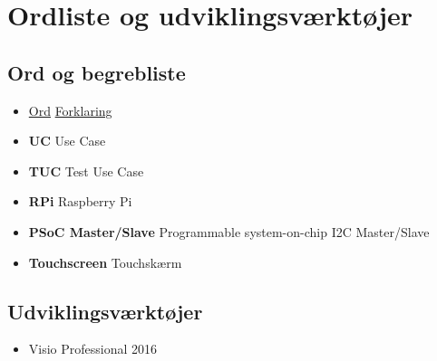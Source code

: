 \chapter{Ordliste og udviklingsværktøjer}
\section{Ord og begrebliste}

\begin{itemize}
    \item[\null] \underline{Ord} \tab \underline{Forklaring}
    \item \textbf{UC} \tab Use Case
    \item \textbf{TUC} \tab Test Use Case
    \item \textbf{RPi} \tab Raspberry Pi
    \item \textbf{PSoC Master/Slave} \tab Programmable system-on-chip I2C Master/Slave
    \item \textbf{Touchscreen} \tab Touchskærm
\end{itemize}

\section{Udviklingsværktøjer}

\begin{itemize}
    \item Visio Professional 2016
\end{itemize}
